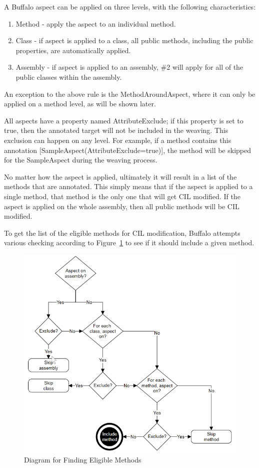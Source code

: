 A Buffalo aspect can be applied on three levels, with the following characteristics:

\begin{enumerate}
  \item Method - apply the aspect to an individual method.
  \item Class - if aspect is applied to a class, all public methods, including the public properties, are automatically applied.
  \item Assembly - if aspect is applied to an assembly, \#2 will apply for all of the public classes within the assembly.
\end{enumerate}

An exception to the above rule is the MethodAroundAspect, where it can only be applied on a method level, as will be shown later.

All aspects have a property named AttributeExclude; if this property is set to true, then the annotated target will not be included in the weaving. This exclusion can happen on any level. For example, if a method contains this annotation [SampleAspect(AttributeExclude=true)], the method will be skipped for the SampleAspect during the weaving process.

No matter how the aspect is applied, ultimately it will result in a list of the methods that are annotated. This simply means that if the aspect is applied to a single method, that method is the only one that will get CIL modified. If the aspect is applied on the whole assembly, then all public methods will be CIL modified.

To get the list of the eligible methods for CIL modification, Buffalo attempts various checking according to Figure~\ref{logical_inclusion} to see if it should include a given method.

\begin{figure}[H]
  \includegraphics[scale=1.0]{AspectLogicalInclusion2.PNG}
  \centering
  \caption{Diagram for Finding Eligible Methods\label{logical_inclusion}}
\end{figure}

